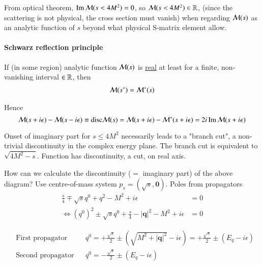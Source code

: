 From optical theorem, $\Im \mathcal{M}(s < 4M^2) = 0$, so $\mathcal{M}(s < 4M^2) \in \mathbb{R}$, (since the scattering is not physical, the cross section must vanish) when regarding $\mathcal{M}(s)$ as an analytic function of $s$ beyond what physical S-matrix element allow.

\paragraph{Schwarz reflection principle}
If (in some region) analytic function $\mathcal{M}(s)$ is \underline{real} at least for a finite, non-vanishing interval $\in \mathbb{R}$, then
\begin{align}
	\mathcal{M}(s^*) = \mathcal{M}^* (s)
\end{align}

Hence 
$$\mathcal{M}(s+i\epsilon)-\mathcal{M}(s-i\epsilon) \equiv \text{disc} \mathcal{M}(s) = \mathcal{M}(s + i\epsilon) - \mathcal{M}^*(s+i\epsilon) = 2i \Im \mathcal{M}(s+i\epsilon)$$
\begin{center}
\end{center}

Onset of imaginary part for $s \leq 4M^2$ necessarily leads to a "branch cut", a non-trivial discontinuity in the complex energy plane. The branch cut is equivalent to $\sqrt{4M^2 - s}$. Function has discontinuity, a cut, on real axis.

How can we calculate the discontinuity ($=$ imaginary part) of the above diagram? Use centre-of-mass system $p_s = (\sqrt{s}, \pmb{0})$. Poles from propagators 
\begin{align*}
   \frac{s}{4} \mp \sqrt{s}q^0 + q^2 - M^2 + i\epsilon &= 0  \\
   \Leftrightarrow (q^0)^2 \pm \sqrt{s} q^0 + \frac{s}{4} - |\pmb{q}|^2 -M^2 + i\epsilon &= 0
\end{align*}

\begin{align*}
	& \text{First propagator} && q^0 = + \frac{\sqrt{s}}{2} \pm (\sqrt{M^2 + |\pmb{q}|^2} - i\epsilon) = +\frac{\sqrt{s}}{2} \pm (E_q - i\epsilon) \\
	& \text{Second propagator} && q^0 = -\frac{\sqrt{s}}{2} \pm (E_q - i\epsilon)
\end{align*}

